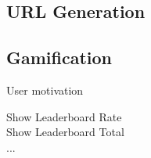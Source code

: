 \subsection{URL Generation}

\subsection{Gamification}
User motivation

\begin{description}
	\item[Show Leaderboard Rate]
	\item[Show Leaderboard Total]
	\item[...]
\end{description}
